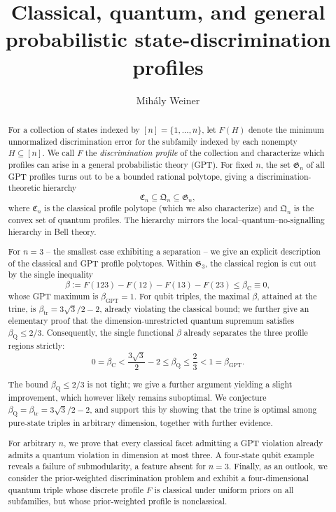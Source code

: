 \documentclass[a4paper,11pt,onecolumn,unpublished]{quantumarticle}
\title{Classical, quantum, and general probabilistic state-discrimination profiles}
\author{Mih\'aly Weiner}
\affiliation{Institute of Mathematics,
	Budapest University of Technology and Economics, Műegyetem rkp.\ 3.,
	H-1111 Budapest, Hungary}
\theoremstyle{definition}
\newcommand{\1}{\mathbf 1}
\newcommand{\Creg}{\mathfrak C}
\newcommand{\Qreg}{\mathfrak Q}
\newcommand{\Greg}{\mathfrak G}
\newcommand{\btr}{\beta_{\mathrm{tr}}}
\begin{document}
\begingroup
\makeatletter
\patchcmd{\@titleatfontsize}{\@title}{\@title\par}{}%
  {}%
\makeatother
{} %
\maketitle
\endgroup
\begin{abstract}
For a collection of states indexed by $[n]=\{1,\ldots,n\}$, let $F(H)$ denote
the minimum unnormalized discrimination error for the subfamily indexed by
each nonempty $H\subseteq[n]$. We call $F$ the \emph{discrimination profile} of
the collection and characterize which profiles can arise in a general
probabilistic theory (GPT). For fixed $n$, the set $\Greg_n$ of all GPT profiles
turns out to be a bounded rational polytope, giving a discrimination-theoretic
hierarchy
\[
 \Creg_n\subseteq\Qreg_n\subseteq\Greg_n,
\]
where $\Creg_n$ is the classical profile polytope (which we also characterize)
and $\Qreg_n$ is the convex set of quantum profiles. The hierarchy mirrors the
local--quantum--no-signalling hierarchy in Bell theory.

For $n=3$ -- the smallest case exhibiting a separation -- we give an explicit
description of the classical and GPT profile polytopes. Within $\Greg_3$, the
classical region is cut out by the single inequality
\[
 \beta:=F(123)-F(12)-F(13)-F(23)\le\beta_{\mathrm C}\equiv0,
\]
whose GPT maximum is $\beta_{\mathrm{GPT}}=1$. For qubit triples, the maximal
$\beta$, attained at the trine, is $\btr=3\sqrt3/2-2$, already violating the
classical bound; we further give an elementary proof that the
dimension-unrestricted quantum supremum satisfies $\beta_{\mathrm Q}\le2/3$.
Consequently, the single functional $\beta$ already separates the three profile
regions strictly:
\[
 0=\beta_{\mathrm C}
 <\frac{3\sqrt3}{2}-2
 \le\beta_{\mathrm Q}
 \le\frac23
 <1=\beta_{\mathrm{GPT}}.
\]

The bound $\beta_{\mathrm Q}\le2/3$ is not tight; we give a further argument
yielding a slight improvement, which however likely remains suboptimal. We
conjecture $\beta_{\mathrm Q}=\btr=3\sqrt3/2-2$, and support this by showing that
the trine is optimal among pure-state triples in arbitrary dimension, together
with further evidence.

For arbitrary $n$, we prove that every classical facet admitting a GPT
violation already admits a quantum violation in dimension at most three. A
four-state qubit example reveals a failure of submodularity, a feature absent
for $n=3$. Finally, as an outlook, we consider the prior-weighted
discrimination problem and exhibit a four-dimensional quantum triple whose
discrete profile $F$ is classical under uniform priors on all subfamilies, but
whose prior-weighted profile is nonclassical.
\end{abstract}
\end{document}
